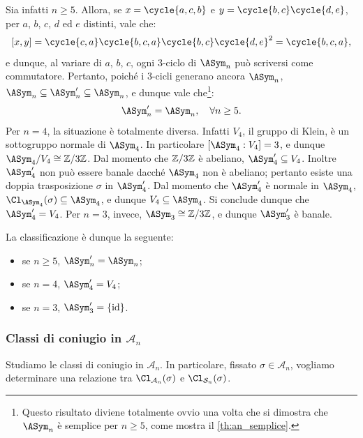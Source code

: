 \documentclass[11pt]{scrartcl}
\begin{document}
	
	Sia infatti $n \geq 5$. Allora, se $x = \cycle{a, c, b}$ e
	$y = \cycle{b, c}\cycle{d, e}$, per $a$, $b$, $c$, $d$ ed $e$ distinti,
	vale che:
	\[ [x, y] = \cycle{c, a} \cycle{b, c, a} \cycle{b, c} \cycle{d, e}^2 = \cycle{b, c, a}, \]
	e dunque, al variare di $a$, $b$, $c$, ogni $3$-ciclo di $\ASym_n$ può scriversi
	come commutatore. Pertanto, poiché i $3$-cicli generano ancora $\ASym_n$, $\ASym_n \subseteq \ASym_n' \subseteq \ASym_n$, e dunque vale che\footnote{
		Questo risultato diviene totalmente ovvio una volta che si dimostra
		che $\ASym_n$ è semplice per $n \geq 5$, come mostra il
		\autoref{th:an_semplice}.
	}:
	\[ \ASym_n' = \ASym_n, \quad \forall n \geq 5. \]
	Per $n = 4$, la situazione è totalmente diversa. Infatti $V_4$, il gruppo
	di Klein, è un sottogruppo normale di $\ASym_4$. In particolare
	$[\ASym_4 : V_4] = 3$, e dunque $\ASym_4 / V_4 \cong \Z{3}$. Dal momento
	che $\mathbb{Z}/{3}\mathbb{Z}$ è abeliano, $\ASym_4' \subseteq V_4$. Inoltre $\ASym_4'$ non
	può essere banale dacché $\ASym_4$ non è abeliano; pertanto esiste
	una doppia trasposizione $\sigma$ in $\ASym_4'$. Dal momento che
	$\ASym_4'$ è normale in $\ASym_4$, $\Cl_{\ASym_4}(\sigma) \subseteq \ASym_4$,
	e dunque $V_4 \subseteq \ASym_4$. Si conclude dunque che $\ASym_4' = V_4$.
	Per $n = 3$, invece, $\ASym_3 \cong \Z{3}$, e dunque $\ASym_3'$ è banale. \medskip
	
	
	La classificazione è dunque la seguente:
	\begin{itemize}
		\item se $n \geq 5$, $\ASym_n' = \ASym_n$;
		\item se $n = 4$, $\ASym_4' = V_4$;
		\item se $n = 3$, $\ASym_3' = \{\id\}$. 
	\end{itemize}
	 
	
	\subsubsection{Classi di coniugio in \texorpdfstring{$\mathcal{A}_n$}{Aₙ}}
	
	Studiamo le classi di coniugio in $\mathcal{A}_n$. In particolare,
	fissato $\sigma \in \mathcal{A}_n$, vogliamo determinare una relazione tra
	$\Cl_{\mathcal{A}_n}(\sigma)$ e $\Cl_{\mathcal{S}_n}(\sigma)$. \medskip
	
\end{document}
